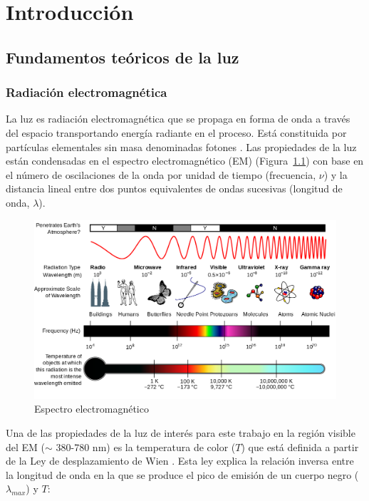 \chapter{Introducción}


\section{Fundamentos teóricos de la luz}

\subsection{Radiación electromagnética}

La luz es radiación electromagnética que se propaga en forma de onda a través del espacio transportando energía radiante en el proceso. Está constituida por partículas elementales sin masa denominadas fotones \citep{Purcell&Morin2013}. Las propiedades de la luz están condensadas en el espectro electromagnético (EM) (Figura~\ref{espectroelectromagnetico}) con base en el número de oscilaciones de la onda por unidad de tiempo (frecuencia, $\nu$) y la distancia lineal entre dos puntos equivalentes de ondas sucesivas (longitud de onda, $\lambda$).\\

\begin{figure}
  \centering
    \includegraphics[width=1\textwidth]{espectroelectromagnetico}
  \caption{Espectro electromagnético \citep{NASA2007}}
  \label{espectroelectromagnetico}
\end{figure}

Una de las propiedades de la luz de interés para este trabajo en la región visible del EM ($\sim$ 380-780 nm) es la temperatura de color ($T$)  que está definida a partir de la Ley de desplazamiento de Wien \citep{Halliday&Resnick2008}. Esta ley explica la relación inversa entre la longitud de onda en la que se produce el pico de emisión de un cuerpo negro ($\lambda_{max}$) y $T$:

